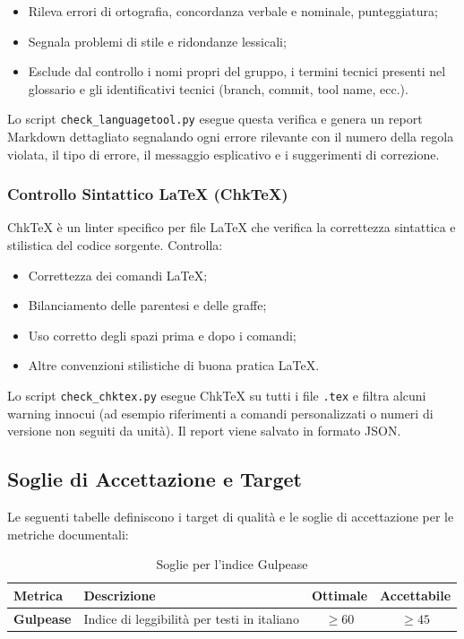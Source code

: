 \documentclass[a4paper,11pt,oneside]{scrartcl}
\begin{document}
\begin{itemize}
    \item Rileva errori di ortografia, concordanza verbale e nominale, punteggiatura;
    \item Segnala problemi di stile e ridondanze lessicali;
    \item Esclude dal controllo i nomi propri del gruppo, i termini tecnici presenti nel glossario e gli identificativi tecnici (branch, commit, tool name, ecc.).
\end{itemize}

Lo script \texttt{check\_languagetool.py} esegue questa verifica e genera un report Markdown dettagliato segnalando ogni errore rilevante con il numero della regola violata, il tipo di errore, il messaggio esplicativo e i suggerimenti di correzione.

\subsubsection{Controllo Sintattico \LaTeX{} (ChkTeX)}

ChkTeX è un linter{\scriptsize{}} specifico per file \LaTeX{} che verifica la correttezza sintattica e stilistica del codice sorgente. Controlla:

\begin{itemize}
    \item Correttezza dei comandi \LaTeX;
    \item Bilanciamento delle parentesi e delle graffe;
    \item Uso corretto degli spazi prima e dopo i comandi;
    \item Altre convenzioni stilistiche di buona pratica \LaTeX.
\end{itemize}

Lo script \texttt{check\_chktex.py} esegue ChkTeX su tutti i file \texttt{.tex} e filtra alcuni warning innocui (ad esempio riferimenti a comandi personalizzati o numeri di versione non seguiti da unità). Il report viene salvato in formato JSON.

\subsection{Soglie di Accettazione e Target}

Le seguenti tabelle definiscono i target di qualità e le soglie di accettazione per le metriche documentali:

\begin{table}[h!]
\centering
\renewcommand{\arraystretch}{1.3}
\begin{tabularx}{\textwidth}{lXcc}
\toprule
\textbf{Metrica} & \textbf{Descrizione} & \textbf{Ottimale} & \textbf{Accettabile} \\
\midrule
\textbf{Gulpease} & Indice di leggibilità per testi in italiano & $\ge 60$ & $\ge 45$ \\
\bottomrule
\end{tabularx}
\caption{Soglie per l'indice Gulpease}
\end{table}
\end{document}
